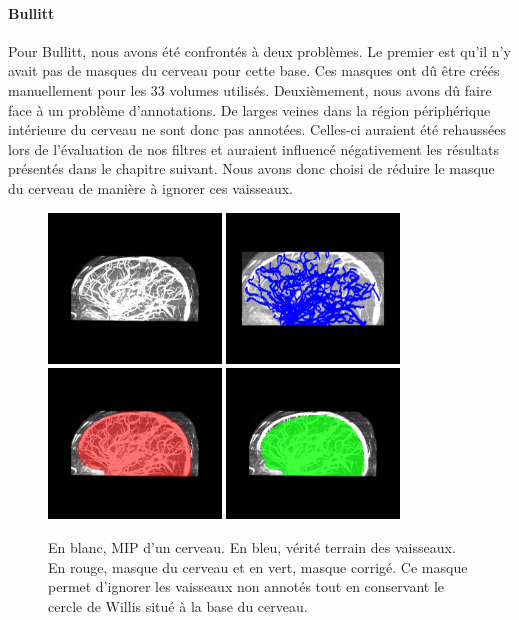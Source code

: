 \paragraph{Bullitt}
Pour Bullitt, nous avons été confrontés à deux problèmes. Le premier est qu'il n'y avait pas de masques du cerveau pour cette base. Ces masques ont dû être créés manuellement pour les 33 volumes utilisés. Deuxièmement, nous avons dû faire face à un problème d'annotations.  De larges veines dans la région périphérique intérieure du cerveau ne sont donc pas annotées. Celles-ci auraient été rehaussées lors de l'évaluation de nos filtres et auraient influencé négativement les résultats présentés dans le chapitre suivant. Nous avons donc choisi de réduire le masque du cerveau de manière à ignorer ces vaisseaux.
\begin{figure}[!ht]
  \centering
  \includegraphics[height=4cm]{Images/bullitt_brain.png}
  \includegraphics[height=4cm]{Images/bullitt_gt.png}
  \includegraphics[height=4cm]{Images/bullitt_brainMask.png}
  \includegraphics[height=4cm]{Images/bullitt_brainMask_ok.png}
  \caption{En blanc, MIP d'un cerveau. En bleu, vérité terrain des vaisseaux. En rouge, masque du cerveau et en vert, masque corrigé. Ce masque permet d'ignorer les vaisseaux non annotés tout en conservant le cercle de Willis situé à la base du cerveau.}
  \label{fig:masques_Bullitt}
\end{figure}
